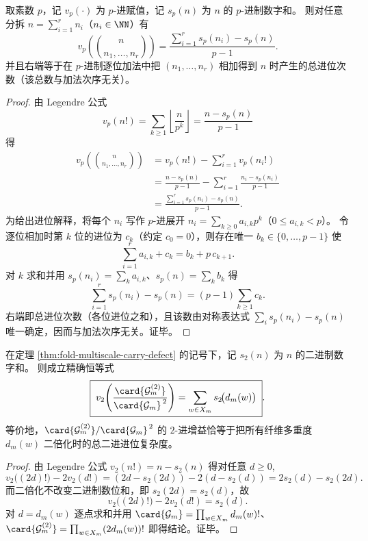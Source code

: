 \begin{theorem}\label{thm:multinomial-vp-carry-signature}
取素数 \(p\)，记 \(v_p(\cdot)\) 为 \(p\)-进赋值，记 \(s_p(n)\) 为 \(n\) 的 \(p\)-进制数字和。
则对任意分拆 \(n=\sum_{i=1}^{r}n_i\)（\(n_i\in\NN\)）有
\[
\boxed{\;
v_p\!\left(\binom{n}{n_1,\dots,n_r}\right)
=
\frac{\sum_{i=1}^{r}s_p(n_i)-s_p(n)}{p-1}.
\;}
\]
并且右端等于在 \(p\)-进制逐位加法中把 \((n_1,\dots,n_r)\) 相加得到 \(n\) 时产生的总进位次数（该总数与加法次序无关）。
\end{theorem}

\begin{proof}
由 Legendre 公式
\[
v_p(n!)=\sum_{k\ge 1}\left\lfloor\frac{n}{p^k}\right\rfloor=\frac{n-s_p(n)}{p-1}
\]
得
\[
\begin{aligned}
v_p\!\left(\binom{n}{n_1,\dots,n_r}\right)
&=v_p(n!)-\sum_{i=1}^{r}v_p(n_i!)\\
&=\frac{n-s_p(n)}{p-1}-\sum_{i=1}^{r}\frac{n_i-s_p(n_i)}{p-1}\\
&=\frac{\sum_{i=1}^{r}s_p(n_i)-s_p(n)}{p-1}.
\end{aligned}
\]
为给出进位解释，将每个 \(n_i\) 写作 \(p\)-进展开 \(n_i=\sum_{k\ge 0}a_{i,k}p^k\)（\(0\le a_{i,k}<p\)）。
令逐位相加时第 \(k\) 位的进位为 \(c_k\)（约定 \(c_0=0\)），则存在唯一 \(b_k\in\{0,\dots,p-1\}\) 使
\[
\sum_{i=1}^{r}a_{i,k}+c_k=b_k+p\,c_{k+1}.
\]
对 \(k\) 求和并用 \(s_p(n_i)=\sum_k a_{i,k}\)、\(s_p(n)=\sum_k b_k\) 得
\[
\sum_{i=1}^{r}s_p(n_i)-s_p(n)=(p-1)\sum_{k\ge 1}c_k.
\]
右端即总进位次数（各位进位之和），且该数由对称表达式 \(\sum_i s_p(n_i)-s_p(n)\) 唯一确定，因而与加法次序无关。证毕。
\end{proof}

\begin{proposition}[二倍化规范体积的二进进位恒等式]\label{prop:fiber-gauge-volume-doubling-v2-digit-sum}
在定理 \ref{thm:fold-multiscale-carry-defect} 的记号下，记 \(s_2(n)\) 为 \(n\) 的二进制数字和。
则成立精确恒等式
\[
\boxed{\;
v_2\!\left(\frac{\card{\mathcal{G}_m^{(2)}}}{\card{\mathcal{G}_m}^{\,2}}\right)
=\sum_{w\in X_m} s_2\!\bigl(d_m(w)\bigr)\; }.
\]
等价地，\(\card{\mathcal{G}_m^{(2)}}/\card{\mathcal{G}_m}^{\,2}\) 的 \(2\)-进增益恰等于把所有纤维多重度 \(d_m(w)\) 二倍化时的总二进进位复杂度。
\end{proposition}
\begin{proof}
由 Legendre 公式 \(v_2(n!)=n-s_2(n)\) 得对任意 \(d\ge 0\),
\[
v_2\bigl((2d)!\bigr)-2v_2(d!)
=(2d-s_2(2d))-2(d-s_2(d))
=2s_2(d)-s_2(2d).
\]
而二倍化不改变二进制数位和，即 \(s_2(2d)=s_2(d)\)，故
\[
v_2\bigl((2d)!\bigr)-2v_2(d!)=s_2(d).
\]
对 \(d=d_m(w)\) 逐点求和并用
\(
\card{\mathcal{G}_m}=\prod_{w\in X_m} d_m(w)!
\)、\(
\card{\mathcal{G}_m^{(2)}}=\prod_{w\in X_m}(2d_m(w))!
\)
即得结论。证毕。
\end{proof}

